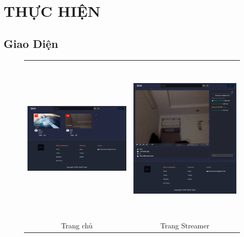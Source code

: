 \chapter{THỰC HIỆN}
\section{Giao Diện}


\begin{center}
\begin{figure}[H]
\begin{tabular}{cc}
  \includegraphics[width=8.5cm, height=8cm]{./imgs/layouts/home} &   \includegraphics[width=8.5cm, height=8cm]{./imgs/layouts/streamer} \\
Trang chủ & Trang Streamer \\[6pt]
\end{tabular}
\end{figure}
\end{center}

